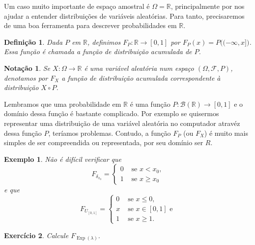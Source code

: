 \documentclass[reqno, final]{book}
\newcommand*\1{\mathds{1}}
\newtheorem{definition}[theorem]{Definição}
\newtheorem{notation}[theorem]{Notação}
\newtheorem{example}{Exemplo}[section]
\newtheorem{exercise}[example]{Exercício}
\DeclareMathOperator{\Exp}{Exp}
\begin{document}
Um caso muito importante de espaço amostral é $\Omega = \mathbb{R}$, principalmente por nos ajudar a entender distribuições de variáveis aleatórias.
Para tanto, precisaremos de uma boa ferramenta para descrever probabilidades em $\mathbb{R}$.

\begin{definition}
  Dada $P$ em $\mathbb{R}$, definimos $F_P:\mathbb{R} \to [0,1]$ por $F_P(x) = P\big((-\infty, x]\big)$.
  Essa função é chamada a \emph{função de distribuição} acumulada de $P$. 
\end{definition}

\begin{notation}
  Se $X:\Omega \to \mathbb{R}$ é uma variável aleatória num espaço $(\Omega, \mathcal{F}, P)$, denotamos por $F_X$  a função de distribuição acumulada correspondente à distribuição $X \circ P$.
\end{notation}

Lembramos que uma probabilidade em $\mathbb{R}$ é uma função $P:\mathcal{B}(\mathbb{R}) \to [0,1]$ e o domínio dessa função é bastante complicado.
Por exemplo se quisermos representar uma distribuição de uma variável aleatória no computador atravéz dessa função $P$, teríamos problemas.
Contudo, a função $F_P$ (ou $F_X$) é muito mais simples de ser compreendida ou representada, por seu domínio ser $R$.

\begin{example}
  Não é difícil verificar que
  \begin{equation}
    F_{\delta_{x_0}} =
    \begin{cases}
      0 & \text{ se $x < x_0$,}\\
      1 & \text{ se $x \geq x_0$}
    \end{cases}
  \end{equation}
  e que
  \begin{equation}
    F_{U_{[0,1]}} =
    \begin{cases}
      0 & \text{ se $x \leq 0$,}\\
      x & \text{ se $x \in [0,1]$ e}\\
      1 & \text{ se $x \geq 1$.}
    \end{cases}
  \end{equation}
\end{example}

\begin{exercise}
  Calcule $F_{\Exp(\lambda)}$.
\end{exercise}
\end{document}
